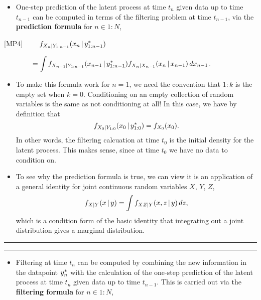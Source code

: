 \documentclass[]{article}
\providecommand{\tightlist}{%
  \setlength{\itemsep}{0pt}\setlength{\parskip}{0pt}}
\begin{document}
\begin{itemize}
\tightlist
\item
  One-step prediction of the latent process at time \(t_{n}\) given data
  up to time \(t_{n-1}\) can be computed in terms of the filtering
  problem at time \(t_{n-1}\), via the \textbf{prediction formula} for
  \(n\in 1:N\),
\end{itemize}

{[}MP4{]}
\(\quad\quad \displaystyle f_{X_{n}|Y_{1:n-1}}(x_{n}{\, | \,} y_{1:n-1}^*)\)

\(\quad\quad \quad\quad \displaystyle = \int f_{X_{n-1}|Y_{1:n-1}}(x_{n-1}{\, | \,} y_{1:n-1}^*) f_{X_{n}|X_{n-1}}(x_{n}{\, | \,} x_{n-1})\, dx_{n-1}\).

\begin{itemize}
\item
  To make this formula work for \(n=1\), we need the convention that
  \(1:k\) is the empty set when \(k=0\). Conditioning on an empty
  collection of random variables is the same as not conditioning at all!
  In this case, we have by definition that
  \[ f_{X_{0}|Y_{1:0}}(x_{0}{\, | \,} y_{1:0}^*) = f_{X_0}(x_0).\] In
  other words, the filtering calcuation at time \(t_0\) is the initial
  density for the latent process. This makes sense, since at time
  \(t_0\) we have no data to condition on.
\item
  To see why the prediction formula is true, we can view it is an
  application of a general identity for joint continuous random
  variables \(X\), \(Y\), \(Z\),
  \[ f_{X|Y}(x{\, | \,} y)= \int f_{XZ|Y}(x,z{\, | \,} y)\, dz,\] which is a
  condition form of the basic identity that integrating out a joint
  distribution gives a marginal distribution.
\end{itemize}

\begin{center}\rule{0.5\linewidth}{\linethickness}\end{center}

\begin{center}\rule{0.5\linewidth}{\linethickness}\end{center}

\begin{itemize}
\tightlist
\item
  Filtering at time \(t_n\) can be computed by combining the new
  information in the datapoint \(y_{n}^*\) with the calculation of
  the one-step prediction of the latent process at time \(t_{n}\) given
  data up to time \(t_{n-1}\). This is carried out via the
  \textbf{filtering formula} for \(n\in 1:N\),
\end{itemize}
\end{document}
